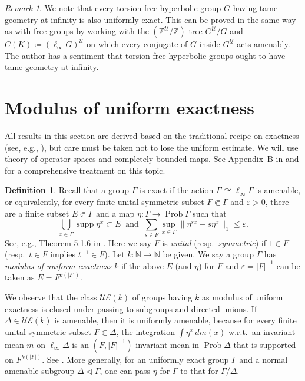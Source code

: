 \documentclass[12pt,nosumlimits,nonamelimits]{amsart}
\theoremstyle{remark}
\newtheorem{rem}[thm]{Remark}
\theoremstyle{definition}
\newtheorem{defn}[thm]{Definition}
\newcommand{\IN}{\mathbb{N}}
\newcommand{\IZ}{\mathbb{Z}}
\newcommand{\cU}{\mathcal{U}}
\newcommand{\ve}{\varepsilon}
\newcommand{\Ga}{\Gamma}
\newcommand{\acts}{\curvearrowright}
\newcommand{\UE}{\mathcal{UE}}
\DeclareMathOperator{\Prob}{Prob}
\DeclareMathOperator{\supp}{supp}
\begin{document}
\begin{rem}
We note that every torsion-free hyperbolic group $G$ 
having tame geometry at infinity is also uniformly exact. 
This can be proved in the same way as with free groups 
by working with the $(\IZ^\cU/\IZ)$-tree $G^\cU/G$ and 
$C(K) \coloneq (\ell_\infty G)^\cU$ on which every 
conjugate of $G$ inside $G^\cU$ acts amenably. 
The author has a sentiment that torsion-free hyperbolic 
groups ought to have tame geometry at infinity.
\end{rem}
%
%
\section{Modulus of uniform exactness}\label{sec:mod}
%
%
All results in this section are derived 
based on the traditional recipe 
on exactness (see, e.g., \cite{bo}), but care must be taken not 
to lose the uniform estimate. 
We will use theory of operator spaces and completely bounded maps. 
See Appendix~B in \cite{bo} and \cite{pisier} for 
a comprehensive treatment on this topic. 
%
\begin{defn}\label{defn:unifex}
Recall that a group $\Ga$ is exact 
if the action $\Ga\acts\ell_\infty\Ga$ is amenable, or equivalently, 
for every finite unital symmetric subset $F\Subset\Ga$ 
and $\ve>0$, there are a finite subset $E\Subset\Ga$ and 
a map $\eta\colon\Ga\to\Prob \Ga$ 
such that 
\[
\bigcup_{x\in\Ga}\supp\eta^x\subset E
\ \mbox{ and }\ 
\sum_{s\in F}\sup_{x\in\Ga}\|\eta^{sx} - s\eta^x\|_1 \le \ve. 
\]
See, e.g., Theorem 5.1.6 in \cite{bo}. 
Here we say $F$ is \emph{unital} (resp.\ \emph{symmetric}) 
if $1\in F$ (resp.\ $t\in F$ implies $t^{-1}\in F$).
Let $k\colon \IN \to \IN$ be given. 
We say a group $\Ga$ has \emph{modulus of 
uniform exactness} $k$ if the above $E$ (and $\eta$) 
for $F$ and $\ve = |F|^{-1}$ can be taken as $E = F^{k(|F|)}$. 
\end{defn}
%
We observe that the class $\UE(k)$ 
of groups having $k$ as modulus of uniform exactness 
is closed under passing to subgroups and directed unions.
If $\Delta \in \UE(k)$ is amenable, then it is uniformly amenable, 
because for every finite unital symmetric subset $F\Subset\Delta$, 
the integration $\int\eta^x\,dm(x)$ w.r.t.\ an invariant 
mean $m$ on $\ell_\infty\Delta$ is an $(F,|F|^{-1})$-invariant 
mean in $\Prob\Delta$ that is supported on $F^{k(|F|)}$. 
See \cite{bozejko, keller, ks, wysoczanski}. 
More generally, for an uniformly exact group $\Ga$ and 
a normal amenable subgroup $\Delta \triangleleft \Ga$, 
one can pass $\eta$ for $\Ga$ to that for $\Ga/\Delta$. 
\end{document}
